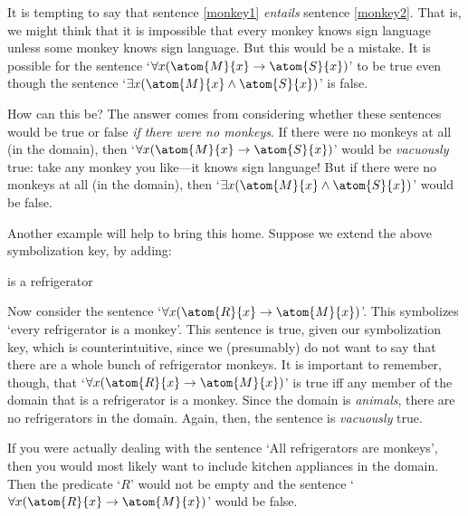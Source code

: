It is tempting to say that sentence \ref{monkey1} \emph{entails} sentence \ref{monkey2}. That is, we might think that it is impossible that every monkey knows sign language unless some monkey knows sign language. But this would be a mistake. It is possible for the sentence `$\forall x(\atom{M}{x} \eif \atom{S}{x})$' to be true even though the sentence `$\exists x(\atom{M}{x} \eand \atom{S}{x})$' is false.

How can this be? The answer comes from considering whether these sentences would be true or false \emph{if there were no monkeys}. If there were no monkeys at all (in the domain), then `$\forall x(\atom{M}{x} \eif \atom{S}{x})$' would be \emph{vacuously} true: take any monkey you like---it knows sign language! But if there were no monkeys at all (in the domain), then `$\exists x(\atom{M}{x} \eand \atom{S}{x})$' would be false.

Another example will help to bring this home. Suppose we extend the above symbolization key, by adding:
	\begin{ekey}
		\item[\atom{R}{x}]  is a refrigerator
	\end{ekey}
Now consider the sentence `$\forall x(\atom{R}{x} \eif \atom{M}{x})$'. This symbolizes `every refrigerator is a monkey'. This sentence is true, given our symbolization key, which is counterintuitive, since we (presumably) do not want to say that there are a whole bunch of refrigerator monkeys. It is important to remember, though, that `$\forall x(\atom{R}{x} \eif \atom{M}{x})$' is true iff any member of the domain that is a refrigerator is a monkey. Since the domain is \emph{animals}, there are no refrigerators in the domain. Again, then, the sentence is \emph{vacuously} true.

If you were actually dealing with the sentence `All refrigerators are monkeys', then you would most likely want to include kitchen appliances in the domain. Then the predicate `$R$' would not be empty and the sentence `$\forall x(\atom{R}{x} \eif \atom{M}{x})$' would be false.


